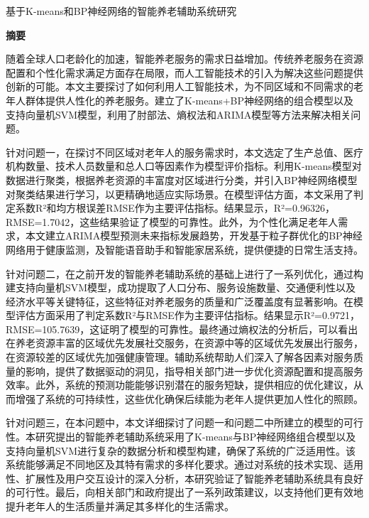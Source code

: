 \documentclass[a4paper]{article}
\begin{document}
\thispagestyle{plain}
\setcounter{page}{1}

\begin{center}
    { 基于K-means和BP神经网络的智能养老辅助系统研究}
\end{center}

\vspace{0.2cm}

\begin{center}
    {\bfseries 摘要}
\end{center}

\vspace{0.1cm}
随着全球人口老龄化的加速，智能养老服务的需求日益增加。传统养老服务在资源配置和个性化需求满足方面存在局限，而人工智能技术的引入为解决这些问题提供创新的可能。本文主要探讨了如何利用人工智能技术，为不同区域和不同需求的老年人群体提供人性化的养老服务。建立了K-means+BP神经网络的组合模型以及支持向量机SVM模型，利用了肘部法、熵权法和ARIMA模型等方法来解决相关问题。

针对问题一，在探讨不同区域对老年人的服务需求时，本文选定了生产总值、医疗机构数量、技术人员数量和总人口等因素作为模型评价指标。利用K-means模型对数据进行聚类，根据养老资源的丰富度对区域进行分类，并引入BP神经网络模型对聚类结果进行学习，以更精确地适应实际场景。在模型评估方面，本文采用了判定系数R²和均方根误差RMSE作为主要评估指标。结果显示，R²=0.96326，RMSE=1.7042，这些结果验证了模型的可靠性。此外，为个性化满足老年人需求，本文建立ARIMA模型预测未来指标发展趋势，开发基于粒子群优化的BP神经网络用于健康监测，及智能语音助手和智能家居系统，提供便捷的日常生活支持。

针对问题二，在之前开发的智能养老辅助系统的基础上进行了一系列优化，通过构建支持向量机SVM模型，成功提取了人口分布、服务设施数量、交通便利性以及经济水平等关键特征，这些特征对养老服务的质量和广泛覆盖度有显著影响。在模型评估方面采用了判定系数R²与RMSE作为主要评估指标。结果显示R²=0.9721，RMSE=105.7639，这证明了模型的可靠性。最终通过熵权法的分析后，可以看出在养老资源丰富的区域优先发展社交服务，在资源中等的区域优先发展出行服务，在资源较差的区域优先加强健康管理。辅助系统帮助人们深入了解各因素对服务质量的影响，提供了数据驱动的洞见，指导相关部门进一步优化资源配置和提高服务效率。此外，系统的预测功能能够识别潜在的服务短缺，提供相应的优化建议，从而增强了系统的可持续性，这些优化确保后续能为老年人提供更加人性化的照顾。

针对问题三，在本问题中，本文详细探讨了问题一和问题二中所建立的模型的可行性。本研究提出的智能养老辅助系统采用了K-means与BP神经网络组合模型以及支持向量机SVM进行复杂的数据分析和模型构建，确保了系统的广泛适用性。该系统能够满足不同地区及其特有需求的多样化要求。通过对系统的技术实现、适用性、扩展性及用户交互设计的深入分析，本研究验证了智能养老辅助系统具有良好的可行性。最后，向相关部门和政府提出了一系列政策建议，以支持他们更有效地提升老年人的生活质量并满足其多样化的生活需求。
\end{document}
